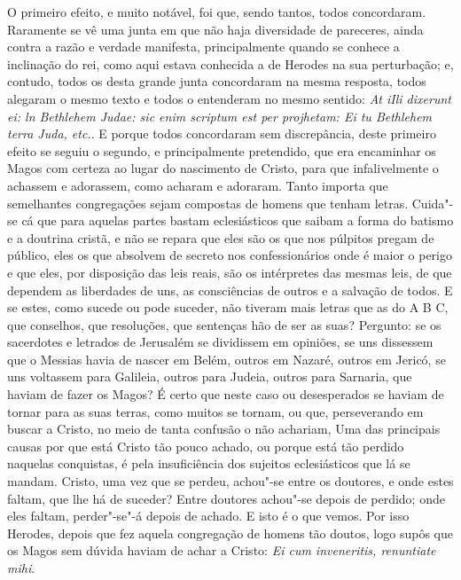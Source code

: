 O primeiro efeito, e muito notável, foi que, sendo tantos, todos
concordaram. Raramente se vê uma junta em que não haja diversidade de
pareceres, ainda contra a
razão e verdade manifesta, principalmente quando se conhece a inclinação
do rei, como aqui estava conhecida a de Herodes na sua perturbação; e,
contudo, todos os desta grande junta concordaram na mesma resposta,
todos alegaram o mesmo texto e todos o entenderam no mesmo sentido:
\emph{At iIli dixerunt ei: ln Bethlehem Judae: sic enim scriptum est per
projhetam: Ei tu Bethlehem terra Juda, etc.}. E porque todos
concordaram sem discrepância, deste primeiro efeito se seguiu o segundo,
e principalmente pretendido, que era encaminhar os Magos com certeza ao
lugar do nascimento de Cristo, para que infalivelmente o achassem e
adorassem, como acharam e adoraram. Tanto importa que semelhantes
congregações sejam compostas de homens que tenham letras. Cuida"-se cá
que para aquelas partes bastam eclesiásticos que saibam a forma do
batismo e a doutrina cristã, e não se repara que eles são os que nos
púlpitos pregam de público, eles os que absolvem de secreto nos
confessionários onde é maior o perigo e que eles, por disposição das
leis reais, são os intérpretes das mesmas leis, de que dependem as
liberdades de uns, as consciências de outros e a salvação de todos. E se
estes, como sucede ou pode suceder, não tiveram mais letras que as do A
B C, que conselhos, que resoluções, que sentenças hão de ser as suas?
Pergunto: se os sacerdotes e letrados de Jerusalém se dividissem em
opiniões, se uns dissessem que o Messias havia de nascer em Belém,
outros em Nazaré, outros em Jericó, se uns voltassem para Galileia,
outros para Judeia, outros para Sarnaria, que haviam de fazer os Magos?
É certo que neste caso ou desesperados se haviam de tornar para as suas
terras, como muitos se tornam, ou que, perseverando em buscar a Cristo,
no meio de tanta confusão o não achariam, Uma das principais causas por
que está Cristo tão pouco achado, ou porque está tão perdido naquelas
conquistas, é pela insuficiência dos sujeitos eclesiásticos que lá se
mandam. Cristo, uma vez que se perdeu, achou"-se entre os doutores, e
onde estes faltam, que lhe há de suceder? Entre doutores achou"-se depois
de perdido; onde eles faltam, perder"-se"-á depois de achado. E isto é o
que vemos. Por isso Herodes, depois que fez aquela congregação de homens
tão doutos, logo supôs que os Magos sem dúvida haviam de achar a Cristo:
\emph{Ei cum inveneritis, renuntiate mihi}.


